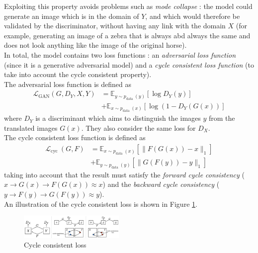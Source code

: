\documentclass[twocolumn,superscriptaddress,aps]{revtex4-1}
\begin{document}
    Exploiting this property avoids problems such as \emph{mode collapse} : the model could generate an image which is in the domain of $Y$, and which would therefore be validated by the discriminator, without having any link with the domain $X$ (for example, generating an image of a zebra that is always abd always the same and does not look anything like the image of the original horse).\\
    
    In total, the model contains two loss functions : an \emph{adversarial loss function} (since it is a generative adversarial model) and a \emph{cycle consistent loss function} (to take into account the cycle consistent property).\\
    
    The adversarial loss function is defined as
    \begin{align}
        \mathcal{L}_{\mathrm{GAN}}\left(G, D_{Y}, X, Y\right)&=\mathbb{E}_{y \sim p_{\text {data }}(y)}\left[\log D_{Y}(y)\right]\nonumber\\
        &+\mathbb{E}_{x \sim p_{\text {data }}(x)}\left[\log \left(1-D_{Y}(G(x))\right]\right.
    \end{align}
    where $D_Y$ is a discriminant which aims to distinguish the images ${y}$ from the translated images ${G(x)}$. They also consider the same loss for $D_X$.\\
    
    The cycle consistent loss function is defined as
    \begin{align}
        \mathcal{L}_{\text {cyc }}(G, F) &=\mathbb{E}_{x \sim p_{\text {data }}(x)}\left[\|F(G(x))-x\|_{1}\right]\nonumber\\
        &+\mathbb{E}_{y \sim p_{\text {data }}(y)}\left[\|G(F(y))-y\|_{1}\right]
    \end{align}
    taking into account that the result must satisfy the \emph{forward cycle consistency} ($x\rightarrow G(x)\rightarrow F(G(x))\approx x$) and the \emph{backward cycle consistency} ($y\rightarrow F(y)\rightarrow G(F(y))\approx y$).\\
    
    An illustration of the cycle consistent loss is shown in Figure \ref{fig:methods.cyclegan.cycleconsistentloss}.\\
    
    \begin{figure}[ht]
        \centering
        \includegraphics[width=0.45\textwidth]{resources/png/cycle-consistent-loss.png}
        \caption{Cycle consistent loss \cite{DBLP:journals/corr/ZhuPIE17}}
        \label{fig:methods.cyclegan.cycleconsistentloss}
    \end{figure}
    
\end{document}
